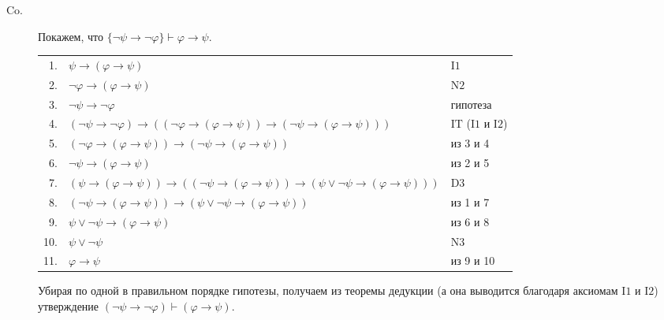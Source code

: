 \documentclass[12pt,a4paper]{article}
\begin{document}
\begin{enumproblem}
\begin{description}
            \item[\underline{$\mathrm{Co}$}.] Покажем, что $\{\neg \psi \rightarrow \neg \varphi\} \vdash \varphi \rightarrow \psi$.
                \begin{center}
                    \begin{tabular}{rll}
                        1.& $\psi \rightarrow (\varphi \rightarrow \psi)$& $\mathrm{I1}$\\
                        2.& $\neg \varphi \rightarrow (\varphi \rightarrow \psi)$& $\mathrm{N2}$\\
                        3.& $\neg \psi \rightarrow \neg \varphi$& гипотеза\\
                        4.& $(\neg \psi \rightarrow \neg \varphi) \rightarrow ((\neg \varphi \rightarrow (\varphi \rightarrow \psi)) \rightarrow (\neg \psi \rightarrow (\varphi \rightarrow \psi)))$& $\mathrm{IT}$ ($\mathrm{I1}$ и $\mathrm{I2}$)\\
                        5.& $(\neg \varphi \rightarrow (\varphi \rightarrow \psi)) \rightarrow (\neg \psi \rightarrow (\varphi \rightarrow \psi))$& из 3 и 4\\
                        6.& $\neg \psi \rightarrow (\varphi \rightarrow \psi)$& из 2 и 5\\
                        7.& $(\psi \rightarrow (\varphi \rightarrow \psi)) \rightarrow ((\neg \psi \rightarrow (\varphi \rightarrow \psi)) \rightarrow (\psi \vee \neg \psi \rightarrow (\varphi \rightarrow \psi)))$& $\mathrm{D3}$\\
                        8.& $(\neg \psi \rightarrow (\varphi \rightarrow \psi)) \rightarrow (\psi \vee \neg \psi \rightarrow (\varphi \rightarrow \psi))$& из 1 и 7\\
                        9.& $\psi \vee \neg \psi \rightarrow (\varphi \rightarrow \psi)$& из 6 и 8\\
                        10.& $\psi \vee \neg \psi$& $\mathrm{N3}$\\
                        11.& $\varphi \rightarrow \psi$& из 9 и 10\\
                    \end{tabular}
                \end{center}
               Убирая по одной в правильном порядке гипотезы, получаем из теоремы дедукции (а она выводится благодаря аксиомам $\mathrm{I1}$ и $\mathrm{I2}$) утверждение $(\neg \psi \rightarrow \neg \varphi) \vdash (\varphi \rightarrow \psi)$.
        \end{description}
    \end{enumproblem}
\end{document}
